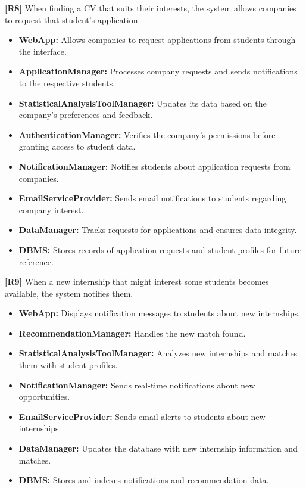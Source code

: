 \textbf{[R8]} When finding a CV that suits their interests, the system allows companies to request that student's application.  
\begin{itemize}
    \item \textbf{WebApp:} Allows companies to request applications from students through the interface.
    \item \textbf{ApplicationManager:} Processes company requests and sends notifications to the respective students.
    \item \textbf{StatisticalAnalysisToolManager:} Updates its data based on the company’s preferences and feedback.
    \item \textbf{AuthenticationManager:} Verifies the company's permissions before granting access to student data.
    \item \textbf{NotificationManager:} Notifies students about application requests from companies.
    \item \textbf{EmailServiceProvider:} Sends email notifications to students regarding company interest.
    \item \textbf{DataManager:} Tracks requests for applications and ensures data integrity.
    \item \textbf{DBMS:} Stores records of application requests and student profiles for future reference.
\end{itemize}

\textbf{[R9]} When a new internship that might interest some students becomes available, the system notifies them.  
\begin{itemize}
    \item \textbf{WebApp:} Displays notification messages to students about new internships.
    \item \textbf{RecommendationManager:} Handles the new match found.
    \item \textbf{StatisticalAnalysisToolManager:} Analyzes new internships and matches them with student profiles.
    \item \textbf{NotificationManager:} Sends real-time notifications about new opportunities.
    \item \textbf{EmailServiceProvider:} Sends email alerts to students about new internships.
    \item \textbf{DataManager:} Updates the database with new internship information and matches.
    \item \textbf{DBMS:} Stores and indexes notifications and recommendation data.
\end{itemize}

